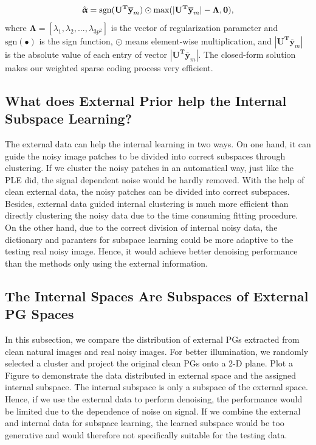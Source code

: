 \documentclass[10pt,twocolumn,letterpaper]{article}
\begin{document}
\begin{equation}\label{equ7}
\setlength{\abovedisplayskip}{3pt}
\setlength{\belowdisplayskip}{4pt}
\hat{\boldsymbol{\upalpha}}= \text{sgn}(\mathbf{U^{T}\overline{y}}_{m})\odot \text{max}(|\mathbf{U^{T}\overline{y}}_{m}|-\mathbf{\Lambda},\mathbf{0}),
\end{equation}
where $\mathbf{\Lambda} = [\lambda_{1},\lambda_{2},...,\lambda_{3p^2}]$ is the vector of regularization parameter and $\text{sgn}(\bullet)$ is the sign function, $\odot$ means element-wise multiplication, and $|\mathbf{U^{T}\overline{y}}_{m}|$ is the absolute value of each entry of vector $|\mathbf{U^{T}\overline{y}}_{m}|$. The closed-form solution makes our weighted sparse coding process very efficient. 
\vspace{-0.05in}

\subsection{What does External Prior help the Internal Subspace Learning?}
The external data can help the internal learning in two ways. On one hand, it can guide the noisy image patches to be divided into correct subspaces through clustering. If we cluster the noisy patches in an automatical way, just like the PLE \cite{ple} did, the signal dependent noise would be hardly removed. With the help of clean external data, the noisy patches can be divided into correct subspaces. Besides, external data guided internal clustering is much more efficient than directly clustering the noisy data due to the time consuming fitting procedure. On the other hand, due to the correct division of internal noisy data, the dictionary and paranters for subspace learning could be more adaptive to the testing real noisy image. Hence, it would achieve better denoising performance than the methods only using the external information.

\subsection{The Internal Spaces Are Subspaces of External PG Spaces}
In this subsection, we compare the distribution of external PGs extracted from clean natural images and real noisy images. For better illumination, we randomly selected a cluster and project the original clean PGs onto a 2-D plane. Plot a Figure to demonstrate the data distributed in external space and the assigned internal subspace. The internal subspace is only a subspace of the external space. Hence, if we use the external data to perform denoising, the performance would be limited due to the dependence of noise on signal. If we combine the external and internal data for subspace learning, the learned subspace would be too generative and would therefore not specifically suitable for the testing data. 
\end{document}
